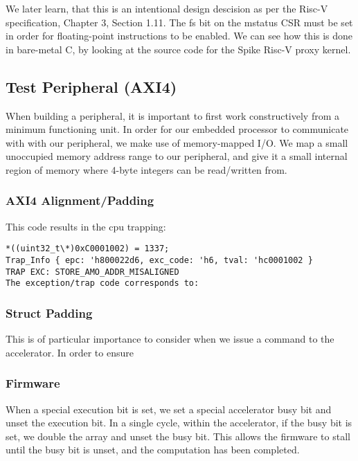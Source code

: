 \documentclass[a4paper,9pt]{report}
\begin{document}
We later learn, that this is an intentional design descision as per the Risc-V
specification, Chapter 3, Section 1.11. The fs bit on the mstatus CSR must be
set in order for floating-point instructions to be enabled. We can see how this
is done in bare-metal C, by looking at the source code for the Spike Risc-V
proxy kernel.


\subsection{Test Peripheral (AXI4)}
When building a peripheral, it is important to first work constructively from a
minimum functioning unit. In order for our embedded processor to communicate
with with our peripheral, we make use of memory-mapped I/O. We map a small
unoccupied memory address range to our peripheral, and give it a small internal
region of memory where 4-byte integers can be read/written from.

\subsubsection{AXI4 Alignment/Padding}
This code results in the cpu trapping:
\begin{verbatim}
*((uint32_t\*)0xC0001002) = 1337;
Trap_Info { epc: 'h800022d6, exc_code: 'h6, tval: 'hc0001002 }
TRAP EXC: STORE_AMO_ADDR_MISALIGNED
The exception/trap code corresponds to:
\end{verbatim}

\subsubsection{Struct Padding}
This is of particular importance to consider when we issue a command to the
accelerator. In order to ensure 


\subsubsection{Firmware}
When a special execution bit is set, we set a special accelerator busy bit and
unset the execution bit. In a single cycle, within the accelerator, if the
busy bit is set, we double the array and unset the busy bit. This allows the
firmware to stall until the busy bit is unset, and the computation has been
completed.
\end{document}
